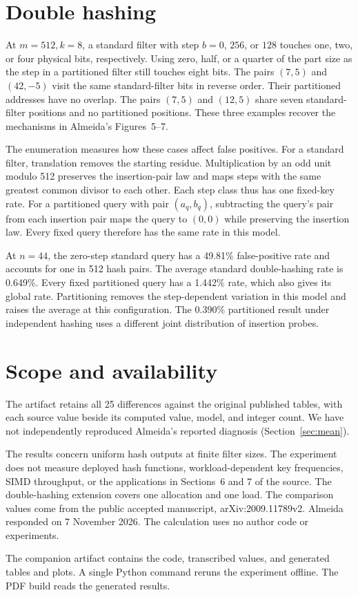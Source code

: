 

\section{Double hashing}
\label{sec:double}

At $m=512,k=8$, a standard filter with step $b=0$, $256$, or $128$
touches one, two, or four physical bits, respectively. Using zero, half,
or a quarter of the part size as the step in a partitioned filter still
touches eight bits. The pairs $(7,5)$ and $(42,-5)$ visit the same
standard-filter bits in reverse order. Their partitioned addresses have no overlap. The
pairs $(7,5)$ and $(12,5)$ share seven standard-filter positions and
no partitioned positions. These three
examples recover the mechanisms in Almeida's Figures~5--7.

The enumeration measures how these cases affect false positives.
For a standard filter, translation removes the starting residue.
Multiplication by an odd unit modulo 512 preserves the insertion-pair
law and maps steps with the same greatest common divisor to each
other. Each step class thus has one fixed-key rate.
For a partitioned query with pair $(a_q,b_q)$, subtracting the query's
pair from each insertion pair maps the query to $(0,0)$ while
preserving the insertion law. Every fixed query therefore has the same rate
in this model.



At $n=44$, the zero-step standard query has a 49.81\% false-positive
rate and accounts for one in 512 hash pairs. The average standard
double-hashing rate is 0.649\%. Every fixed partitioned query has a
1.442\% rate, which also gives its global rate. Partitioning removes the
step-dependent variation in this model and raises the average at this
configuration. The 0.390\% partitioned result under independent hashing
uses a different joint distribution of insertion probes.

\section{Scope and availability}

The artifact retains all 25 differences against the original published
tables, with each source value beside its computed value, model, and
integer count. We have not independently reproduced Almeida's reported
diagnosis (Section~\ref{sec:mean}).

The results concern uniform hash outputs at finite filter sizes. The
experiment does not measure deployed hash functions, workload-dependent
key frequencies, SIMD throughput, or the applications in Sections~6 and
7 of the source. The double-hashing extension covers one allocation and
one load. The comparison values come from the public accepted manuscript,
arXiv:2009.11789v2. Almeida responded on 7 November 2026. The calculation
uses no author code or experiments.

The companion artifact contains the code, transcribed values, and
generated tables and plots. A single Python command reruns the
experiment offline. The PDF build reads the generated results.
